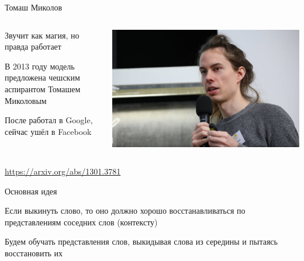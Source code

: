 \documentclass[notes,12pt, aspectratio=169]{beamer}
\newenvironment{wideitemize}{\itemize\addtolength{\itemsep}{10pt}}{\enditemize}
\begin{document}
\begin{frame}{Томаш Миколов}
\begin{columns}[T] 
\begin{column}{.4\textwidth}
\begin{wideitemize} 
\item \alert{Звучит как магия, но правда работает}

\item  В 2013 году модель предложена чешским аспирантом  Томашем Миколовым

\item После работал в Google, сейчас ушёл в Facebook  
\end{wideitemize} 
\end{column}%
\hfill%
\begin{column}{.6\textwidth}
\begin{center}
\includegraphics[width=.99\linewidth]{tomas-mikolov.jpg}
\end{center}
\end{column}%
\end{columns}
\vfill
\footnotesize  {\color{blue} \url{https://arxiv.org/abs/1301.3781}}
\end{frame}


\begin{frame}{Основная идея}
\begin{wideitemize} 
	\item  Если выкинуть слово, то оно должно хорошо восстанавливаться по представлениям соседних слов (контексту)
	\item  Будем обучать представления слов, выкидывая слова из середины и пытаясь восстановить их
\end{wideitemize} 
\end{frame} 
\end{document}
